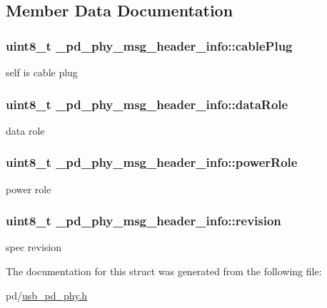 \subsection{Member Data Documentation}
\hypertarget{struct__pd__phy__msg__header__info_a068ae6e534efaaa108dbd0aa75256a63}{
\subsubsection[{cable\-Plug}]{\setlength{\rightskip}{0pt plus 5cm}uint8\-\_\-t \-\_\-pd\-\_\-phy\-\_\-msg\-\_\-header\-\_\-info\-::cable\-Plug}}\label{struct__pd__phy__msg__header__info_a068ae6e534efaaa108dbd0aa75256a63}
self is cable plug \hypertarget{struct__pd__phy__msg__header__info_a7f921ee0d685a1f6818dce56ee1ef8f2}{
\subsubsection[{data\-Role}]{\setlength{\rightskip}{0pt plus 5cm}uint8\-\_\-t \-\_\-pd\-\_\-phy\-\_\-msg\-\_\-header\-\_\-info\-::data\-Role}}\label{struct__pd__phy__msg__header__info_a7f921ee0d685a1f6818dce56ee1ef8f2}
data role \hypertarget{struct__pd__phy__msg__header__info_a11c74e61a0e7ab66caf6c73321d9d016}{
\subsubsection[{power\-Role}]{\setlength{\rightskip}{0pt plus 5cm}uint8\-\_\-t \-\_\-pd\-\_\-phy\-\_\-msg\-\_\-header\-\_\-info\-::power\-Role}}\label{struct__pd__phy__msg__header__info_a11c74e61a0e7ab66caf6c73321d9d016}
power role \hypertarget{struct__pd__phy__msg__header__info_a64122118bd2c482eea1b178b459e1aae}{
\subsubsection[{revision}]{\setlength{\rightskip}{0pt plus 5cm}uint8\-\_\-t \-\_\-pd\-\_\-phy\-\_\-msg\-\_\-header\-\_\-info\-::revision}}\label{struct__pd__phy__msg__header__info_a64122118bd2c482eea1b178b459e1aae}
spec revision 

The documentation for this struct was generated from the following file\-:\begin{DoxyCompactItemize}
\item 
pd/\hyperlink{usb__pd__phy_8h}{usb\-\_\-pd\-\_\-phy.\-h}\end{DoxyCompactItemize}
